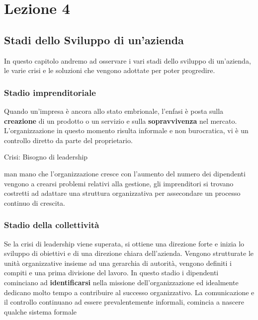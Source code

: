 \documentclass[14pt]{extarticle}
\begin{document}
\section{Lezione 4}

\subsection{Stadi dello Sviluppo di un'azienda}

In questo capitolo andremo ad osservare i vari stadi dello sviluppo di
un'azienda, le varie crisi e le soluzioni che vengono adottate per poter
progredire.

\subsubsection{Stadio imprenditoriale}

Quando un'impresa è ancora allo stato embrionale, l'enfasi è posta sulla
\textbf{creazione} di un prodotto o un servizio e sulla \textbf{sopravvivenza}
nel mercato. L'organizzazione in questo momento risulta informale e non
burocratica, vi è un controllo diretto da parte del proprietario.

\begin{center}
    \textcolor{red!50}{Crisi: Bisogno di leadership}

    man mano che l'organizzazione cresce con l'aumento del numero dei dipendenti
    vengono a crearsi problemi relativi alla gestione, gli imprenditori si
    trovano costretti ad adattare una struttura organizzativa per assecondare un
    processo continuo di crescita.
\end{center}

\subsubsection{Stadio della collettività}

Se la crisi di leadership viene superata, si ottiene una direzione forte e
inizia lo sviluppo di obiettivi e di una direzione chiara dell'azienda. Vengono
strutturate le unità organizzative insieme ad una gerarchia di autorità, vengono
definiti i compiti e una prima divisione del lavoro. In questo stadio i
dipendenti cominciano ad \textbf{identificarsi} nella missione
dell'organizzazione ed idealmente dedicano molto tempo a contribuire al successo
organizzativo. La comunicazione e il controllo continuano ad essere
prevalentemente informali, comincia a nascere qualche sistema formale
\end{document}
